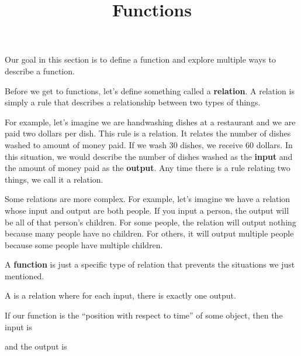 \documentclass{ximera}
\title{Functions}
\begin{document}
\begin{abstract} \end{abstract}
\maketitle


Our goal in this section is to define a function and explore multiple ways to describe a function.

Before we get to functions, let's define something called a \textbf{relation}. A relation is simply a rule that describes a relationship between two types of things.

For example, let's imagine we are handwashing dishes at a restaurant and we are paid two dollars per dish. This rule is a relation. It relates the number of dishes washed to amount of money paid. If we wash 30 dishes, we receive 60 dollars. In this situation, we would describe the number of dishes washed as the \textbf{input} and the amount of money paid as the \textbf{output}. Any time there is a rule relating two things, we call it a relation.

Some relations are more complex. For example, let's imagine we have a relation whose input and output are both people. If you input a person, the output will be all of that person's children. For some people, the relation will output nothing because many people have no children. For others, it will output multiple people because some people have multiple children. 

A \textbf{function} is just a specific type of relation that prevents the situations we just mentioned.

\begin{definition}
A  is a relation where for each input,
there is exactly one output.
\end{definition}

\begin{question}
  If our function is the ``position with respect to time'' of some
  object, then the input is
  \begin{multipleChoice}
  \end{multipleChoice}
  and the output is
  \begin{multipleChoice}
  \end{multipleChoice}
\end{question}
\end{document}
